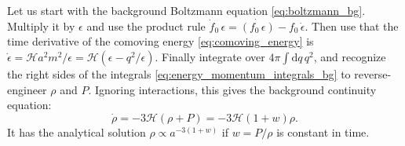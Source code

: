 \documentclass[USenglish, thumbmarks]{uiophdthesis} %
\newcommand\diff{\mathrm{d}}
\newcommand\calH{\mathcal{H}}
\begin{document}
Let us start with the background Boltzmann equation \eqref{eq:boltzmann_bg}.
Multiply it by $\epsilon$
and use the product rule $\dot{f}_0 \, \epsilon = \dot{(f_0 \, \epsilon)} - f_0 \, \dot{\epsilon}$.
Then use that the time derivative of the comoving energy \eqref{eq:comoving_energy}
is $\dot{\epsilon} = \calH a^2 m^2 / \epsilon = \calH(\epsilon - q^2/\epsilon)$.
Finally integrate over $4\pi \int \diff{q} \, q^2$,
and recognize the right sides of the integrals \eqref{eq:energy_momentum_integrals_bg} to reverse-engineer $\rho$ and $P$.
Ignoring interactions, this gives the background continuity equation:
\begin{equation}
\dot{\rho} = -3 \calH (\rho + P) = -3 \calH (1+w) \rho .
\label{eq:fluid_continuity_bg}
\end{equation}
It has the analytical solution $\rho \propto a^{-3(1+w)}$
if $w=P/\rho$ is constant in time.
\end{document}
